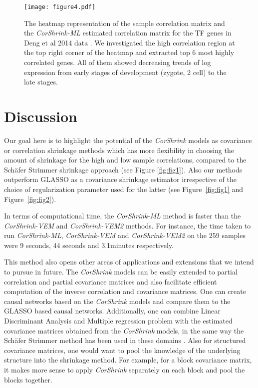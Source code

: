\begin{figure*}[h]
\raggedleft
\texttt{[image: figure4.pdf]}
 \caption{\small{The heatmap representation of the sample correlation matrix and the \textit{CorShrink-ML} estimated correlation matrix for the TF genes in Deng et al 2014 data \cite{Deng2014}. We investigated the high correlation region at the top right corner of the heatmap and extracted top $6$  most highly correlated genes. All of them showed decreasing trends of log expression from early stages of development (zygote, 2 cell) to the late stages.}}
\label{fig:fig4}
\end{figure*}

\section{Discussion}
 
Our goal here is to highlight the potential of the \textit{CorShrink} models as covariance or correlation shrinkage methods which has more flexibility in choosing the amount of shrinkage for the high and low sample correlations, compared to the 
Sch\"{a}fer Strimmer shrinkage approach (see Figure \ref{fig:fig1}). Also our methods outperform GLASSO as a covariance shrinkage estimator  irrespective of the choice of regularization parameter used for the latter (see Figure~\ref{fig:fig1} and Figure~\ref{fig:fig2}). 

In terms of computational time, the \textit{CorShrink-ML} method is faster than the  \textit{CorShrink-VEM} and \textit{CorShrink-VEM2} methods. For instance, the time taken to run \textit{CorShrink-ML}, \textit{CorShrink-VEM} and \textit{CorShrink-VEM2} on the $259$ samples were  9 seconds,  44 seconds  and 3.1minutes  
respectively.

This method also opens other areas of applications and extensions that we intend to pursue in future. The \textit{CorShrink} models can be easily extended to partial correlation and partial covariance matrices and also facilitate efficient computation of the inverse correlation and covariance matrices. One can create causal networks based on the \textit{CorShrink} models and compare them to the GLASSO based causal networks. Additionally, one can combine Linear Discriminant Analysis and  Multiple regression problem with the estimated covariance matrices obtained from the \textit{CorShrink} models, in the same way the Sch\"{a}fer Strimmer method has been used in these domains \cite{Xu2009} \cite{Schafer2005}. Also for structured covariance matrices, one would want to pool the knowledge of the underlying structure into the shrinkage method. For example, for a block covariance matrix, it makes more sense to apply \textit{CorShrink} separately on each block and pool the blocks together. 

